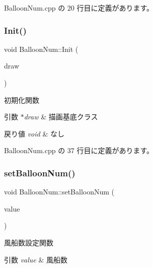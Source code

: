  Balloon\+Num.\+cpp の 20 行目に定義があります。

\mbox{\label{class_balloon_num_a9754a1dcc393bdf2cb7fc7c94809ed34}} 
\subsubsection{\texorpdfstring{Init()}{Init()}}
{\footnotesize\ttfamily void Balloon\+Num\+::\+Init (\begin{DoxyParamCaption}\item[{\mbox{\hyperlink{class_draw_base}{Draw\+Base}} $\ast$}]{draw }\end{DoxyParamCaption})}



初期化関数 


\begin{DoxyParams}{引数}
{\em $\ast$draw} & 描画基底クラス \\
\hline
\end{DoxyParams}

\begin{DoxyRetVals}{戻り値}
{\em void} & なし \\
\hline
\end{DoxyRetVals}


 Balloon\+Num.\+cpp の 37 行目に定義があります。

\mbox{\label{class_balloon_num_a8245a82ff0803d06024ca6695def56f0}} 
\subsubsection{\texorpdfstring{set\+Balloon\+Num()}{setBalloonNum()}}
{\footnotesize\ttfamily void Balloon\+Num\+::set\+Balloon\+Num (\begin{DoxyParamCaption}\item[{int}]{value }\end{DoxyParamCaption})}



風船数設定関数 


\begin{DoxyParams}{引数}
{\em value} & 風船数 \\
\hline
\end{DoxyParams}


